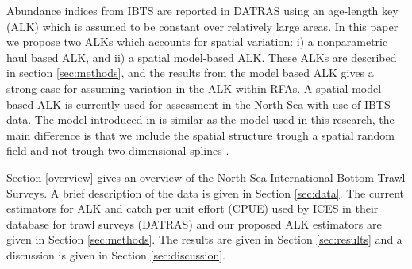 \documentclass[a4paper 12pt]{article}
\numberwithin{equation}{section}
\begin{document}
Abundance indices from IBTS are reported in DATRAS \citep{datras} using an age-length key (ALK) \citep{fridriksson1934calculation} which is assumed to be constant over relatively large areas. In this paper we propose two ALKs which accounts for spatial variation: i) a nonparametric  haul based ALK, and ii) a spatial model-based ALK. These ALKs are described in section \ref{sec:methods}, and the results from the model based ALK gives a strong case for assuming variation in the ALK within RFAs. %
A spatial model based ALK \citep{berg2012spatial} is currently used for assessment in the North Sea with use of IBTS data. The model introduced in \citet{berg2012spatial} is similar as the model used in this research, the main difference is that we include the spatial structure trough a spatial random field \citep{lindgren2011explicit} and not trough two dimensional splines \citep{wood2017generalized}.%

Section \ref{overview} gives an  overview of the  North Sea International Bottom Trawl Surveys. A brief description of the data is given in Section \ref{sec:data}. The current estimators for ALK and catch per unit effort (CPUE) used by ICES in their database for trawl surveys (DATRAS) and our proposed ALK estimators are given in Section \ref{sec:methods}. The results are given in Section \ref{sec:results} and a discussion is given in Section \ref{sec:discussion}.
\end{document}
